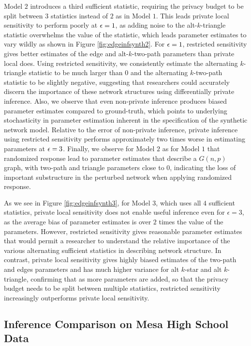  Model $2$ introduces a third sufficient statistic, requiring the privacy budget to be split between $3$ statistics instead of $2$ as in Model $1$. This leads private local sensitivity to perform poorly at $\epsilon=1$, as adding noise to the alt-$k$-triangle statistic overwhelms the value of the statistic, which leads parameter estimates to vary wildly as shown in Figure \ref{fig:edgeinfsynth2}. For $\epsilon=1$, restricted sensitivity gives better estimates of the edge and alt-$k$-two-path parameters than private local does. Using restricted sensitivity, we consistently estimate the alternating $k$-triangle statistic to be much larger than $0$ and the alternating $k$-two-path statistic to be slightly negative, suggesting that researchers could accurately discern the importance of these network structures using differentially private inference. Also, we observe that even non-private inference produces biased parameter estimates compared to ground-truth, which points to underlying stochasticity in parameter estimation inherent in the specification of the synthetic network model. Relative to the error of non-private inference, private inference using restricted sensitivity performs approximately two times worse in estimating parameters at $\epsilon = 3$. Finally, we observe for Model $2$ as for Model $1$ that randomized response lead to parameter estimates that describe a $G(n,p)$ graph, with two-path and triangle parameters close to $0$, indicating the loss of important substructure in the perturbed network when applying randomized response.
 
 As we see in Figure \ref{fig:edgeinfsynth3}, for Model $3$, which uses all $4$ sufficient statistics, private local sensitivity does not enable useful inference even for $\epsilon=3$, as the average bias of parameter estimates is over $2$ times the value of the parameters. However, restricted sensitivity gives reasonable parameter estimates that would permit a researcher to understand the relative importance of the various alternating sufficient statistics in describing network structure. In contrast, private local sensitivity gives highly biased estimates of the two-path and edges parameters and has much higher variance for alt $k$-star and alt $k$-triangle, confirming that as more parameters are added, so that the privacy budget needs to be split between multiple statistics, restricted sensitivity increasingly outperforms private local sensitivity.

  \subsection{Inference Comparison on Mesa High School Data}
  

